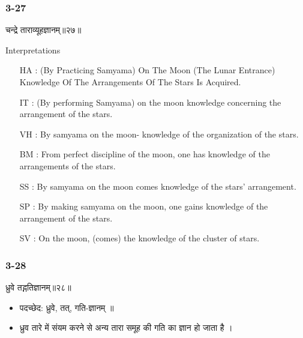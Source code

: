 \begin{frame}[fragile]\frametitle{3-27}
\begin{sanskrit}
चन्द्रे ताराव्यूहज्ञानम्॥२७॥
\end{sanskrit}

Interpretations
\begin{itemize}	
\item [HA]: (By Practicing Samyama) On The Moon (The Lunar Entrance) Knowledge Of The Arrangements Of The Stars Is Acquired.
\item [IT]: (By performing Samyama) on the moon knowledge concerning the arrangement of the stars.
\item [VH]: By samyama on the moon- knowledge of the organization of the stars.
\item [BM]: From perfect discipline of the moon, one has knowledge of the arrangements of the stars.
\item [SS]: By samyama on the moon comes knowledge of the stars’ arrangement.
\item [SP]: By making samyama on the moon, one gains knowledge of the arrangement of the stars.
\item [SV]: On the moon, (comes) the knowledge of the cluster of stars. 
\end{itemize}
\end{frame}

\begin{frame}[fragile]\frametitle{3-28}
\begin{sanskrit}
ध्रुवे तद्गतिज्ञानम्॥२८॥
\end{sanskrit}

\begin{itemize}
\item पदच्छेद:   ध्रुवे, तत्, गति-ज्ञानम् ॥
\item ध्रुव तारे में संयम करने से अन्य तारा समूह की गति का ज्ञान हो जाता है ।
\end{itemize}
\end{frame}


